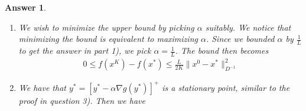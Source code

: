 \documentclass[12pt]{article}
\theoremstyle{colon}
\newtheorem*{answer}{Answer}
\begin{document}
\begin{answer}
\begin{enumerate}[label=\arabic*)]
\begin{gather*}
      \end{gather*}
      Applying this to \eqref{eqn:new_base} yields
      \begin{gather*}
        g(y^{k+1}) \leq g(y^*) -\frac{1}{\alpha}(y^* - y^{k+1})^T (y^k - y^{k+1}) + \frac{1}{2 \alpha} \lVert y^{k+1} - y^k \rVert^2 \\
        g(y^{k+1}) \leq g(y^*) + \frac{1}{2\alpha} \left[ -2(y^* - y^{k+1})^T (y^k - y^{k+1}) + \lVert y^{k+1} - y^k \rVert^2 \right] \\
        g(y^{k+1}) \leq g(y^*) + \frac{1}{2\alpha} \big[ -2(y^* - y^{k+1})^T (y^k - y^*) \\
        -2(y^* - y^{k+1})^T (y^* - y^{k+1})  + \lVert y^{k+1} - y^* \rVert^2 \\
        + \lVert y^k - y^* \rVert^2 +2(y^* - y^{k+1})^T (y^k - y^*) \big] \\
        g(y^{k+1}) \leq g(y^*) + \frac{1}{2\alpha} \left[\lVert y^k - y^* \rVert^2 - \lVert y^{k+1} - y^* \rVert^2 \right]
      \end{gather*}
      Which, is a telescoping sum. Thus
      \begin{gather*}
        \frac{1}{K} \sum_{k = 0}^K g(y^k) - g(y^*) \leq \frac{1}{2 \alpha K} \lVert y^0 - y^* \rVert^2
      \end{gather*}
      But, since $g(y^k)$ is decreasing, we have $g(y^K) \leq \frac{1}{K} \sum_{k = 0}^K g(y^k)$. This yields
      \begin{gather*}
        0 \leq g(y^K) - g(y^*) \leq \frac{1}{2 \alpha K} \lVert y^0 - y^* \rVert^2
      \end{gather*}
      Which is equivalent to
      \begin{gather*}
        0 \leq f(x^K) - f(x^*) \leq \frac{1}{2 \alpha K} \lVert x^0 - x^* \rVert_{D^{-1}}^2
      \end{gather*}
    \item We wish to minimize the upper bound by picking $\alpha$ suitably. We notice that minimizing the bound is equivalent to maximizing $\alpha$. Since we bounded $\alpha$ by $\frac{1}{L}$ to get the answer in part 1), we pick $\alpha = \frac{1}{L}$. The bound then becomes
      \begin{gather*}
        0 \leq f(x^K) - f(x^*) \leq \frac{L}{2 K} \lVert x^0 - x^* \rVert_{D^{-1}}^2
      \end{gather*}
    \item We have that $y^* = [y^* - \alpha \nabla g(y^*)]^+$ is a stationary point, similar to the proof in question 3). Then we have

\end{enumerate}
\end{answer}
\end{document}
